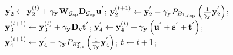 \begin{figure}[!t]
\begin{algorithm}[H]
\begin{algorithmic}[1]
				\STATE $\mathbf{y}_{2}^{'} \leftarrow \mathbf{y}_{2}^{(t)} + \gamma_{\mathbf{y}_{}} \mathbf{W}_{\mathcal{G}_{\text{sp}}} \mathbf{D}_{\mathcal{G}_{\text{sp}}} \mathbf{u}^{'}$;
    			\STATE $\mathbf{y}_{2}^{(t+1)} \leftarrow \mathbf{y}_{2}^{'} - \gamma_{\mathbf{y}_{}} P_{B_{1, \rho_{\text{sp}}}} \left(\frac{1}{\gamma_{\mathbf{y}_{}}} \mathbf{y}_{2}^{'}  \right)$;
				\STATE $\mathbf{y}_{3}^{(t+1)} \leftarrow \mathbf{y}_{3}^{(t)} + \gamma_{\mathbf{y}_{}} \mathbf{D}_{\text{v}} \mathbf{t}^{'}$;
    			\STATE $\mathbf{y}_{4}^{'} \leftarrow \mathbf{y}_{4}^{(t)} + \gamma_{\mathbf{y}_{}} \left( \mathbf{u}^{'} + \mathbf{s}^{'} + \mathbf{t}^{'} \right)$;
    			\STATE $\mathbf{y}_{4}^{(t+1)} \leftarrow \mathbf{y}_{4}^{'} - \gamma_{\mathbf{y}_{}} P_{B_{2, \varepsilon}^{\mathbf{v}}} \left(\frac{1}{\gamma_{\mathbf{y}_{}}} \mathbf{y}_{4}^{'}  \right)$;
    			\STATE $t \leftarrow t + 1$;
			\ENDWHILE
		\end{algorithmic}
	\end{algorithm}
	\vspace{-2mm}
\end{figure}